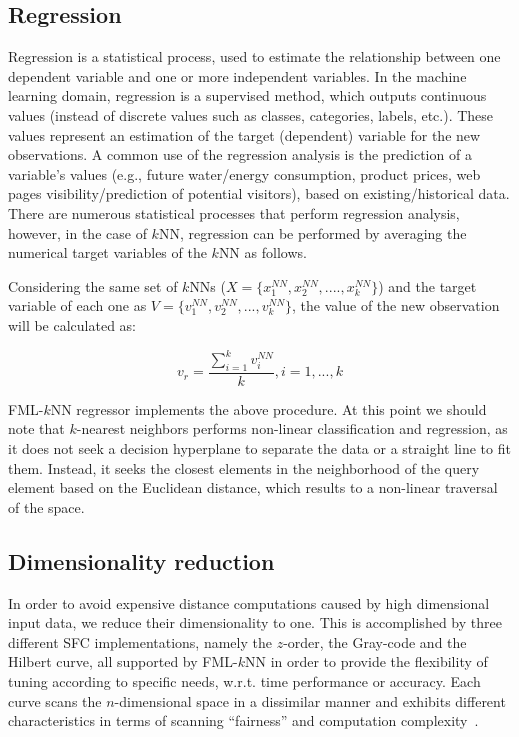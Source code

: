 \subsection{Regression}
\label{subsec:regression}
Regression is a statistical process, used to estimate the relationship between one dependent variable and one or more independent variables. In the machine learning domain, regression is a supervised method, which outputs continuous values (instead of discrete values such as classes, categories, labels, etc.). These values represent an estimation of the target (dependent) variable for the new observations. A common use of the regression analysis is the prediction of a variable's values (e.g., future water/energy consumption, product prices, web pages visibility/prediction of potential visitors), based on existing/historical data. There are numerous statistical processes that perform regression analysis, however, in the case of $k$NN, regression can be performed by averaging the numerical target variables of the $k$NN as follows.

Considering the same set of $k$NNs ($X = \{x_{1}^{NN}, x_{2}^{NN}, ...., x_{k}^{NN}\}$) and the target variable of each one as $V = \{v_{1}^{NN}, v_{2}^{NN}, ..., v_{k}^{NN}\}$, the value of the new observation will be calculated as:

\begin{equation}
	v_{r} = \frac{\sum_{i=1}^{k} v_{i}^{NN}}{k}, i=1, ..., k
\end{equation}

FML-$k$NN regressor implements the above procedure. At this point we should note that $k$-nearest neighbors performs non-linear classification and regression, as it does not seek a decision hyperplane to separate the data or a straight line to fit them. Instead, it seeks the closest elements in the neighborhood of the query element based on the Euclidean distance, which results to a non-linear traversal of the space.

\subsection{Dimensionality reduction}
\label{subsec:dim_red}
In order to avoid expensive distance computations caused by high dimensional input data, we reduce their dimensionality to one. This is accomplished by three different SFC implementations, namely the $z$-order, the Gray-code and the Hilbert curve, all supported by FML-$k$NN in order to provide the flexibility of tuning according to specific needs, w.r.t. time performance or accuracy. Each curve scans the $n$-dimensional space in a dissimilar manner and exhibits different characteristics in terms of scanning ``fairness'' and computation complexity~\cite{mokbel2002pms}.

